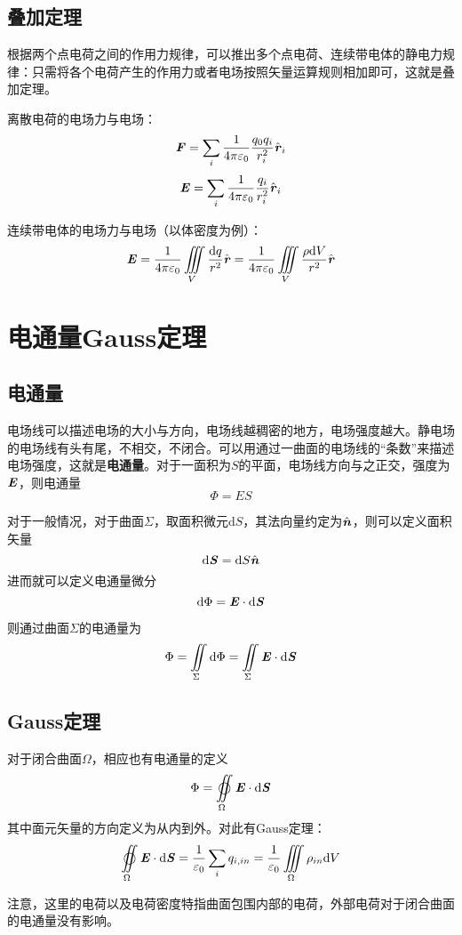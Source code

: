 \documentclass[UTF8,openany]{book}
\begin{document}
	\subsection{叠加定理}
	根据两个点电荷之间的作用力规律，可以推出多个点电荷、连续带电体的静电力规律：只需将各个电荷产生的作用力或者电场按照矢量运算规则相加即可，这就是叠加定理。\par
	离散电荷的电场力与电场：
	$$\textbf{\textit{F}}=\sum_{i}\frac{1}{4\pi\varepsilon_0}\frac{q_0q_i}{r_i^2}\hat{\textbf{\textit{r}}}_i$$
	$$\textbf{\textit{E}}=\sum_{i}\frac{1}{4\pi\varepsilon_0}\frac{q_i}{r_i^2}\hat{\textbf{\textit{r}}}_i$$\par
	连续带电体的电场力与电场（以体密度为例）：
	$$\textbf{\textit{E}}=\frac{1}{4\pi\varepsilon_0}
	\iiint\limits_{V}\frac{\mathrm{d}q}{r^2}\hat{\textbf{\textit{r}}}=
	\frac{1}{4\pi\varepsilon_0}\iiint\limits_{V}\frac{\rho\mathrm{d}V}{r^2}\hat{\textbf{\textit{r}}}$$
	\section{电通量\quad Gauss定理}
	\subsection{电通量}
	电场线可以描述电场的大小与方向，电场线越稠密的地方，电场强度越大。静电场的电场线有头有尾，不相交，不闭合。可以用通过一曲面的电场线的“条数”来描述电场强度，这就是\textbf{电通量}。对于一面积为$S$的平面，电场线方向与之正交，强度为$\textbf{\textit{E}}$，则电通量
	$$\Phi=ES$$\par
	对于一般情况，对于曲面$\Sigma$，取面积微元$\mathrm{d}S$，其法向量约定为$\hat{\textbf{\textit{n}}}$，则可以定义面积矢量
	$$\mathrm{d}\textbf{\textit{S}}=\mathrm{d}S\hat{\textbf{\textit{n}}}$$
	进而就可以定义电通量微分
	$$\mathrm{d}\Phi=\textbf{\textit{E}}\cdot\mathrm{d}\textbf{\textit{S}}$$\par
	则通过曲面$\Sigma$的电通量为
	$$\Phi=\iint\limits_{\Sigma}\mathrm{d}\Phi=\iint\limits_{\Sigma}\textbf{\textit{E}}\cdot\mathrm{d}\textbf{\textit{S}}$$
	\subsection{Gauss定理}
	对于闭合曲面$\Omega$，相应也有电通量的定义
	$$\Phi=\varoiint\limits_{\Omega}\textbf{\textit{E}}\cdot\mathrm{d}\textbf{\textit{S}}$$
	其中面元矢量的方向定义为从内到外。对此有Gauss定理：
	$$\varoiint\limits_{\Omega}\textbf{\textit{E}}\cdot\mathrm{d}\textbf{\textit{S}}=
	\frac{1}{\varepsilon_0}\sum_{i}q_{i,in}=
	\frac{1}{\varepsilon_0}\iiint\limits_{\Omega}\rho_{in}\mathrm{d}V$$
	\par 注意，这里的电荷以及电荷密度特指曲面包围内部的电荷，外部电荷对于闭合曲面的电通量没有影响。
\end{document}

